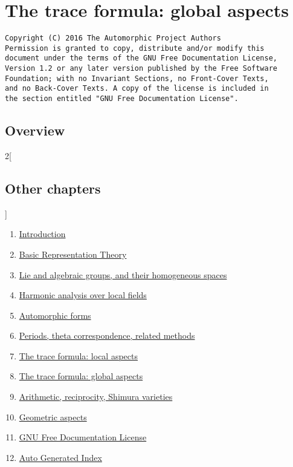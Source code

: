 \documentclass{stacks-project-book}
\theoremstyle{plain}
\theoremstyle{definition}
\theoremstyle{remark}
\numberwithin{equation}{subsection}
\begin{document}
%

\chapter{The trace formula: global aspects}



\label{traceformulaglobal-section-phantom}

\begin{verbatim}
Copyright (C) 2016 The Automorphic Project Authors
Permission is granted to copy, distribute and/or modify this
document under the terms of the GNU Free Documentation License,
Version 1.2 or any later version published by the Free Software
Foundation; with no Invariant Sections, no Front-Cover Texts,
and no Back-Cover Texts. A copy of the license is included in
the section entitled "GNU Free Documentation License".
\end{verbatim}



\section{Overview}
\label{traceformulaglobal-section-overview}




\begin{multicols}{2}[\section{Other chapters}]
\noindent
\begin{enumerate}
\item \hyperref[introduction-section-phantom]{Introduction}
\item \hyperref[representationtheory-section-phantom]{Basic Representation Theory}
\item \hyperref[algebraicgroups-section-phantom]{Lie and algebraic groups, and their homogeneous spaces}
\item \hyperref[harmonicanalysis-section-phantom]{Harmonic analysis over local fields}
\item \hyperref[automorphicforms-section-phantom]{Automorphic forms}
\item \hyperref[periods-section-phantom]{Periods, theta correspondence, related methods}
\item \hyperref[traceformulalocal-section-phantom]{The trace formula: local aspects}
\item \hyperref[traceformulaglobal-section-phantom]{The trace formula: global aspects}
\item \hyperref[arithmetic-section-phantom]{Arithmetic, reciprocity, Shimura varieties}
\item \hyperref[geometric-section-phantom]{Geometric aspects}
\item \hyperref[fdl-section-phantom]{GNU Free Documentation License}
\item \hyperref[index-section-phantom]{Auto Generated Index}
\end{enumerate}
\end{multicols}
\end{document}
